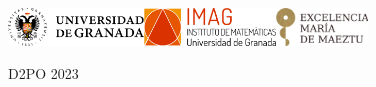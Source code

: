 
\def\maketitle{\ifbeamer@inframe\titlepage\else\frame[plain]{\titlepage}\fi}
\def\titlepage{\usebeamertemplate{title page}}
{
	\begin{minipage}[b][\paperheight]{\textwidth}
	\vspace*{5mm}
	\includegraphics[height=10mm]{Images/ugrH.png}\hfill \includegraphics[height=10mm]{Images/IMAG.png}\hspace{0.5cm}\includegraphics[height=10mm]{Images/maeztu.png}\par
	\vspace*{5mm}
	\vfill
	\ifx\insertsubtitle\@empty%
	\else%
		\centering
		{\MakeUppercase{\inserttitle}\par}%
	\fi%
	\ifx\insertsubtitle\@empty%
	\else%
		{\insertsubtitle\par}%
		\vspace*{5mm}
	\fi%
	\vfill	
	\ifx\insertauthor\@empty%
	\else%
		{\insertauthor\par}%
	\fi%
	\ifx\insertinstitut\@empty%
	\else%
		\vspace*{3mm}
		{\insertinstitute\par}%
	\fi%
	\vfill
	D2PO 2023

	\ifx\insertdate\@empty%
	\else%
		{\insertdate\par}%
	\fi%
	
	
	
	\vspace*{5mm}
	\end{minipage}
}